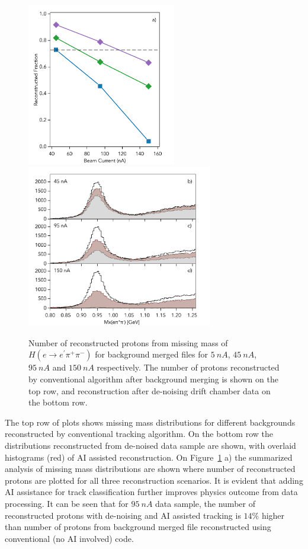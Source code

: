 \begin{figure}[!h]
\begin{center}
 \includegraphics[height=2.8in]{images/graph_mxepipi_dn_ai.pdf}
 \includegraphics[height=2.8in]{images/plots_mxepipi_dn_ai.pdf}
\caption {Number of reconstructed protons from missing mass of $H(e \rightarrow e^\prime \pi^+\pi^-)$ for background 
merged files for  $5~nA$, $45~nA$, $95~nA$ and $150~nA$ respectively. The number of protons reconstructed by 
conventional algorithm after background merging is shown on the top row, and reconstruction after  de-noising drift 
chamber data on the bottom row.}
 \label{physics::conv_dn_ai}
 \end{center}
\end{figure}

The top row of plots shows missing mass distributions for different backgrounds reconstructed by conventional tracking algorithm. On the bottom row the distributions reconstructed from de-noised data sample are shown, with overlaid histograms (red) of AI assisted reconstruction. On Figure~\ref{physics::conv_dn_ai} a) the summarized analysis of missing mass distributions are shown where number of reconstructed protons are plotted for all three reconstruction scenarios. It is evident that adding AI assistance for track classification further improves physics outcome from data processing. It can be seen that for $95~nA$ data sample, the number of reconstructed protons with de-noising and AI assisted tracking is $14\%$ higher than number of protons from background merged file reconstructed using conventional (no AI involved) code.




